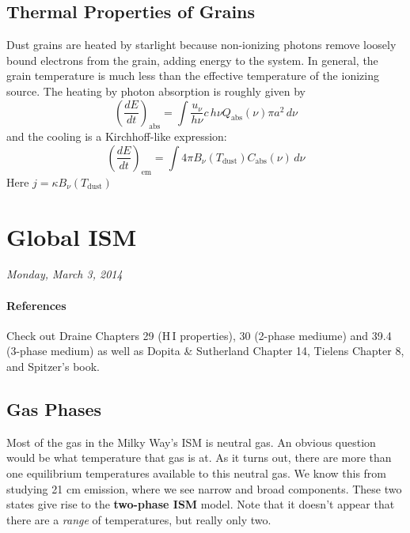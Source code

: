 \documentclass[10pt]{article}
\numberwithin{equation}{section}
\begin{document}
\subsection{Thermal Properties of Grains} %
\label{sub:thermal_properties_of_grains}
Dust grains are heated by starlight because non-ionizing photons remove loosely
bound electrons from the grain, adding energy to the system. In general, the
grain temperature is much less than the effective temperature of the ionizing
source. The heating by photon absorption is roughly given by
\begin{equation}
  \label{eq:dust:9} \left(\frac{dE}{dt}\right)_{\mathrm{abs}} = \int
  \frac{u_\nu}{h\nu} c\,h\nu Q_{\mathrm{abs}}(\nu)\pi a^2\,d\nu
\end{equation}
and the cooling is a Kirchhoff-like expression:
\begin{equation}
  \label{eq:dust:10} \left(\frac{dE}{dt}\right)_{\mathrm{em}} = \int 4\pi
  B_\nu(T_{\mathrm{dust}})C_{\mathrm{abs}}(\nu)\,d\nu
\end{equation}
Here $j=\kappa B_\nu(T_{\mathrm{dust}})$
\section{Global ISM} %
\label{sec:global_ism}
\textit{Monday, March 3, 2014}
\paragraph{References} %
\label{par:references}
Check out Draine Chapters 29 (H\,I properties), 30 (2-phase mediume) and 39.4
(3-phase medium) as well as Dopita \& Sutherland Chapter 14, Tielens Chapter 8,
and Spitzer's book.
\subsection{Gas Phases} %
\label{sub:gas_phases}
Most of the gas in the Milky Way's ISM is neutral gas. An obvious question
would be what temperature that gas is at. As it turns out, there are more than
one equilibrium temperatures available to this neutral gas. We know this from
studying 21 cm emission, where we see narrow and broad components. These two
states give rise to the \textbf{two-phase ISM} model. Note that it doesn't
appear that there are a \emph{range} of temperatures, but really only two.\\
\end{document}

